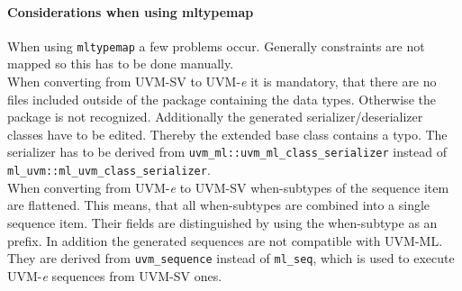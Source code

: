\paragraph{Considerations when using mltypemap}
When using \lstinline$mltypemap$ a few problems occur. Generally constraints are not mapped so this has to be done manually.\\
When converting from UVM-SV to UVM-\textit{e} it is mandatory, that there are no files included outside of the package containing the data types. Otherwise the package is not recognized. Additionally the generated serializer/deserializer classes have to be edited. Thereby the extended base class contains a typo. The serializer has to be derived from \lstinline$uvm_ml::uvm_ml_class_serializer$ instead of \lstinline$ml_uvm::ml_uvm_class_serializer$.\\
When converting from UVM-\textit{e} to UVM-SV when-subtypes of the sequence item are flattened. This means, that all when-subtypes are combined into a single sequence item. Their fields are distinguished by using the when-subtype as an prefix. In addition the generated sequences are not compatible with UVM-ML. They are derived from \lstinline$uvm_sequence$ instead of \lstinline$ml_seq$, which is used to execute UVM-\textit{e} sequences from UVM-SV ones.

